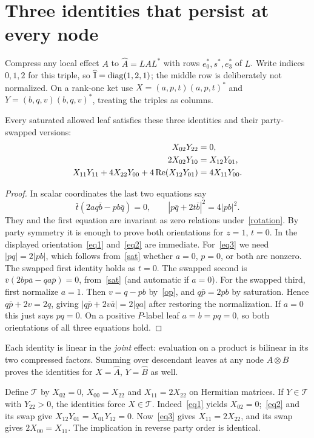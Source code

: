 \documentclass[11pt]{article}
\begin{document}
\section{Three identities that persist at every node}
Compress any local effect $A$ to $\widehat A=L A L^*$ with rows $e_0^*,s^*,e_3^*$ of $L$. Write indices $0,1,2$ for this triple, so $\widehat{\mathbb I}=\operatorname{diag}(1,2,1)$; the middle row is deliberately not normalized. On a rank-one ket use $X=(a,p,t)(a,p,t)^*$ and $Y=(b,q,v)(b,q,v)^*$, treating the triples as columns.
\begin{lemma}\label{bil}
Every saturated allowed leaf satisfies these three identities and their party-swapped versions:
\begin{align}
 X_{02}Y_{22}&=0,\label{eq1}\\
 2X_{02}Y_{10}&=X_{12}Y_{01},\label{eq2}\\
 X_{11}Y_{11}+4X_{22}Y_{00}+4\operatorname{Re}(X_{12}Y_{01})&=4X_{11}Y_{00}.\label{eq3}
\end{align}
\end{lemma}
\begin{proof}
In scalar coordinates the last two equations say
\[
 \bar t(2a q\bar b-p b\bar q)=0,\qquad
 |p\bar q+2t\bar b|^2=4|p b|^2.
\]
They and the first equation are invariant as zero relations under~\eqref{rotation}. By party symmetry it is enough to prove both orientations for $z=1$, $t=0$. In the displayed orientation~\eqref{eq1} and~\eqref{eq2} are immediate. For~\eqref{eq3} we need $|p q|=2|p b|$, which follows from~\eqref{sat} whether $a=0$, $p=0$, or both are nonzero.
The swapped first identity holds as $t=0$. The swapped second is $\bar v(2 b p\bar a-q a\bar p)=0$, from~\eqref{sat} (and automatic if $a=0$). For the swapped third, first normalize $a=1$. Then $v=q-pb$ by~\eqref{op}, and $q\bar p=2p b$ by saturation. Hence $q\bar p+2v=2q$, giving $|q\bar p+2v\bar a|=2|q a|$ after restoring the normalization. If $a=0$ this just says $pq=0$. On a positive $P$-label leaf $a=b=pq=0$, so both orientations of all three equations hold.
\end{proof}
Each identity is linear in the \emph{joint} effect: evaluation on a product is bilinear in its two compressed factors. Summing over descendant leaves at any node $A\otimes B$ proves the identities for $X=\widehat A$, $Y=\widehat B$ as well.

Define $\mathcal T$ by $X_{02}=0$, $X_{00}=X_{22}$ and $X_{11}=2X_{22}$ on Hermitian matrices. If $Y\in\mathcal T$ with $Y_{22}>0$, the identities force $X\in\mathcal T$. Indeed~\eqref{eq1} yields $X_{02}=0$;~\eqref{eq2} and its swap give $X_{12}Y_{01}=X_{01}Y_{12}=0$. Now~\eqref{eq3} gives $X_{11}=2X_{22}$, and its swap gives $2X_{00}=X_{11}$. The implication in reverse party order is identical.
\end{document}
